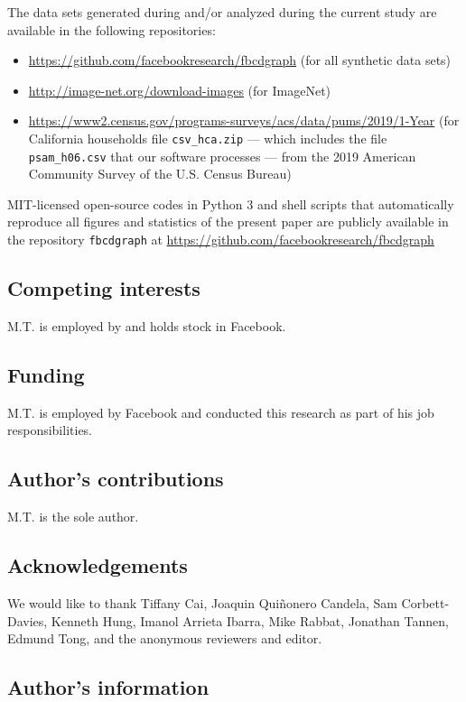 \documentclass{article}
\begin{document}
The data sets generated during and/or analyzed during the current study
are available in the following repositories:
%
\begin{itemize}
\item \url{https://github.com/facebookresearch/fbcdgraph}
(for all synthetic data sets)
\item \url{http://image-net.org/download-images}
(for ImageNet)
\item \url{https://www2.census.gov/programs-surveys/acs/data/pums/2019/1-Year}
(for California households file {\tt csv\_hca.zip}
--- which includes the file {\tt psam\_h06.csv} that our software processes ---
from the 2019 American Community Survey of the U.S. Census Bureau)
\end{itemize}

\noindent MIT-licensed open-source codes in Python 3 and shell scripts
that automatically reproduce all figures and statistics of the present paper
are publicly available in the repository {\tt fbcdgraph} at
\url{https://github.com/facebookresearch/fbcdgraph}


\subsection*{Competing interests}

M.T. is employed by and holds stock in Facebook.


\subsection*{Funding}

M.T. is employed by Facebook and conducted this research
as part of his job responsibilities.


\subsection*{Author's contributions}

M.T. is the sole author.


\subsection*{Acknowledgements}

We would like to thank Tiffany Cai, Joaquin Qui\~nonero Candela,
Sam Corbett-Davies, Kenneth Hung, Imanol Arrieta Ibarra, Mike Rabbat,
Jonathan Tannen, Edmund Tong, and the anonymous reviewers and editor.


\subsection*{Author's information}
\end{document}

